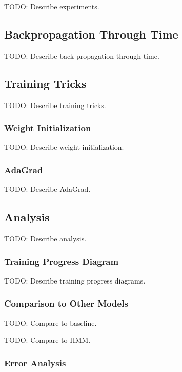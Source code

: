 \documentclass[11pt]{article}
\begin{document}
TODO: Describe experiments.

\subsection{Backpropagation Through Time}

TODO: Describe back propagation through time.

\subsection{Training Tricks}

TODO: Describe training tricks.

\subsubsection{Weight Initialization}

TODO: Describe weight initialization.

\subsubsection{AdaGrad}

TODO: Describe AdaGrad.

\subsection{Analysis}

TODO: Describe analysis.

\subsubsection{Training Progress Diagram}

TODO: Describe training progress diagrams.

\subsubsection{Comparison to Other Models}

TODO: Compare to baseline.

TODO: Compare to HMM.

\subsubsection{Error Analysis}
\end{document}
